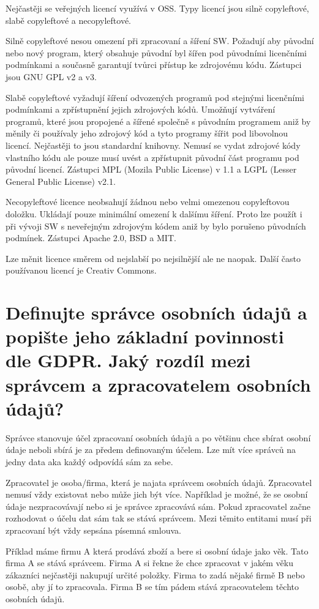 \documentclass[12pt,a4paper,czech]{article}
\newcommand{\nadpis}[1]{{\section{#1}}}
\begin{document}
Nejčastěji se veřejných licencí využívá v OSS. Typy licencí jsou silně copyleftové, slabě copyleftové a necopyleftové.

Silně copyleftové nesou omezení při zpracovaní a šíření SW. Požadují aby původní nebo nový program, který obsahuje původní byl šířen pod původními licenčními podmínkami a současně garantují tvůrci přístup ke zdrojovému kódu. Zástupci jsou GNU GPL v2 a v3.

Slabě copyleftové vyžadují šíření odvozených programů pod stejnými licenčními podmínkami a zpřístupnění jejich zdrojových kódů. Umožňují vytváření programů, které jsou propojené a šířené společně s původním programem aniž by měnily či používaly jeho zdrojový kód a tyto programy šířit pod libovolnou licencí. Nejčastěji to jsou standardní knihovny. Nemusí se vydat zdrojové kódy vlastního kódu ale pouze musí uvést a zpřístupnit původní část programu pod původní licencí. Zástupci MPL (Mozila Public License) v 1.1 a  LGPL (Lesser General Public License) v2.1.

Necopyleftové licence neobsahují žádnou nebo velmi omezenou copyleftovou doložku. Ukládají pouze minimální omezení k dalšímu šíření. Proto lze použít i při vývoji SW s neveřejným zdrojovým kódem aniž by bylo porušeno původních podmínek. Zástupci Apache 2.0, BSD a MIT.

Lze měnit licence směrem od nejslabší po nejsilnější ale ne naopak. Další často používanou licencí je Creativ Commons.


\vspace{0.5cm} 
\nadpis{Definujte správce osobních údajů a popište jeho základní povinnosti dle GDPR. Jaký rozdíl mezi správcem a zpracovatelem osobních údajů?}

Správce stanovuje účel zpracovaní osobních údajů a po většinu chce sbírat osobní údaje neboli sbírá je za předem definovaným účelem. Lze mít více správců na jedny data aka každý odpovídá sám za sebe.

Zpracovatel je osoba/firma, která je najata správcem osobních údajů. Zpracovatel nemusí vždy existovat nebo může jich být více. Například je možné, že se osobní údaje nezpracovávají nebo si je správce zpracovává sám. Pokud zpracovatel začne rozhodovat o účelu dat sám tak se stává správcem.\newline
Mezi těmito entitami musí při zpracovaní být vždy sepsána písemná smlouva.

Příklad máme firmu A která prodává zboží a bere si osobní údaje jako věk. Tato firma A se stává správcem. Firma A si řekne že chce zpracovat v jakém věku zákazníci nejčastěji nakupují určité položky. Firma to zadá nějaké firmě B nebo osobě, aby jí to zpracovala. Firma B se tím pádem stává zpracovatelem těchto osobních údajů.
\end{document}
